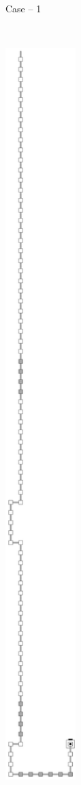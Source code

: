 \begin{figure}[H]
\begin{subfigure}[t]{0.3\textwidth}
                \caption{\label{fig:return_paths/return_digit1_read_next_row} Case -- 1}
            \end{subfigure}%
            ~
            \begin{subfigure}[t]{0.3\textwidth}
                \centering
                \includegraphics[width=0.3\textwidth]{return_paths/return_digit2_read_next_row}

\end{subfigure}
\end{figure}
